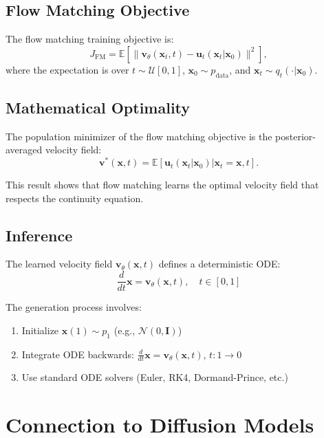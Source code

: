 \subsection{Flow Matching Objective}

The flow matching training objective is:
\begin{equation}
    J_{\text{FM}} = \mathbb{E}\left[\|\mathbf{v}_\theta(\mathbf{x}_t, t) - \mathbf{u}_t(\mathbf{x}_t|\mathbf{x}_0)\|^2\right],
\end{equation}
where the expectation is over $t \sim \mathcal{U}[0,1]$, $\mathbf{x}_0 \sim p_{\text{data}}$, and $\mathbf{x}_t \sim q_t(\cdot|\mathbf{x}_0)$.

\subsection{Mathematical Optimality}

The population minimizer of the flow matching objective is the posterior-averaged velocity field:
\begin{equation}
    \mathbf{v}^*(\mathbf{x},t) = \mathbb{E}\left[\mathbf{u}_t(\mathbf{x}_t|\mathbf{x}_0) \bigg| \mathbf{x}_t = \mathbf{x}, t\right].
\end{equation}

This result shows that flow matching learns the optimal velocity field that respects the continuity equation.

\subsection{Inference}

The learned velocity field $\mathbf{v}_\theta(\mathbf{x},t)$ defines a deterministic ODE:
\begin{equation}
    \frac{d}{dt} \mathbf{x} = \mathbf{v}_\theta(\mathbf{x},t), \quad t \in [0,1]
\end{equation}

The generation process involves:
\begin{enumerate}
    \item Initialize $\mathbf{x}(1) \sim p_1$ (e.g., $\mathcal{N}(0,\mathbf{I})$)
    \item Integrate ODE backwards: $\frac{d}{dt} \mathbf{x} = \mathbf{v}_\theta(\mathbf{x},t)$, $t: 1 \to 0$
    \item Use standard ODE solvers (Euler, RK4, Dormand-Prince, etc.)
\end{enumerate}

\section{Connection to Diffusion Models}

